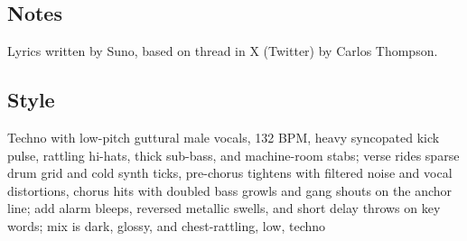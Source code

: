 \subsection{Notes}
Lyrics written by Suno, based on thread in X (Twitter) by Carlos Thompson.


\subsection{Style}
Techno with low-pitch guttural male vocals, 132 BPM, heavy syncopated kick pulse, rattling hi-hats, thick sub-bass, and machine-room stabs; verse rides sparse drum grid and cold synth ticks, pre-chorus tightens with filtered noise and vocal distortions, chorus hits with doubled bass growls and gang shouts on the anchor line; add alarm bleeps, reversed metallic swells, and short delay throws on key words; mix is dark, glossy, and chest-rattling, low, techno

